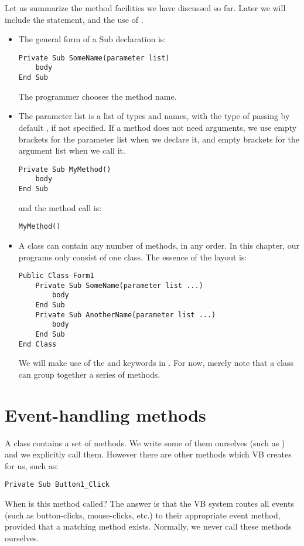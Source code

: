 		Let us summarize the method facilities we have discussed so far. Later we will include the  statement, and the use of .
		\begin{itemize}
			\item The general form of a Sub declaration is:
				\begin{lstlisting}
Private Sub SomeName(parameter list)
	body 
End Sub
				\end{lstlisting}
				The programmer chooses the method name.
			\item The parameter list is a list of types and names, with the type of passing by default , if not specified. If a method does not need arguments, we use empty brackets for the parameter list when we declare it, and empty brackets for the argument list when we call it.
				\begin{lstlisting}
Private Sub MyMethod()
	body
End Sub
				\end{lstlisting}
	and the method call is:
				\begin{lstlisting}
MyMethod()
				\end{lstlisting}
			\item A class can contain any number of methods, in any order. In this chapter, our programs only consist of one class. The essence of the layout is:
				\begin{lstlisting}
Public Class Form1
	Private Sub SomeName(parameter list ...)
		body
	End Sub
	Private Sub AnotherName(parameter list ...)
		body
	End Sub
End Class
				\end{lstlisting}
				We will make use of the  and  keywords in . For now, merely note that a class can group together a series of methods.
		\end{itemize}

		
	\section{Event-handling methods}
		A class contains a set of methods. We write some of them ourselves (such as ) and we explicitly call them. However there are other methods which VB creates for us, such as:
		\begin{lstlisting}
Private Sub Button1_Click
		\end{lstlisting}
		When is this method called? The answer is that the VB system routes all events (such as button-clicks, mouse-clicks, etc.) to their appropriate event method, provided that a matching method exists. Normally, we never call these methods ourselves.


